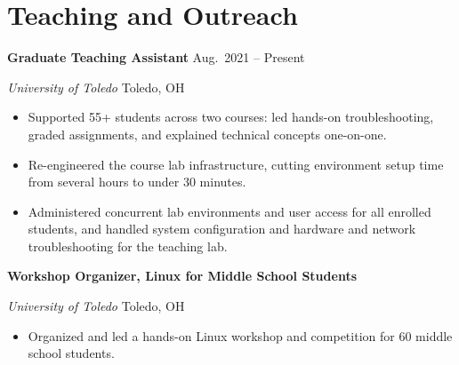 \documentclass[11pt,letterpaper]{article}
\newcommand{\entry}[4]{%
  \textbf{#1} \hfill #2\par
  \textit{#3} \hfill #4\par\vspace{1pt}}
\begin{document}
\section{Teaching and Outreach}
\entry{Graduate Teaching Assistant}{Aug.\ 2021 -- Present}
      {University of Toledo}{Toledo, OH}
\begin{itemize}
  \item Supported 55+ students across two courses:
        led hands-on troubleshooting, graded assignments, and explained technical
        concepts one-on-one.
  \item Re-engineered the course lab infrastructure, cutting environment setup time
        from several hours to under 30 minutes.
  \item Administered concurrent lab environments and user access for all enrolled
        students, and handled system configuration and hardware and network
        troubleshooting for the teaching lab.
\end{itemize}
\vspace{3pt}
\entry{Workshop Organizer, Linux for Middle School Students}{}
      {University of Toledo}{Toledo, OH}
\begin{itemize}
  \item Organized and led a hands-on Linux workshop and competition for 60 middle
        school students.
\end{itemize}

\end{document}
